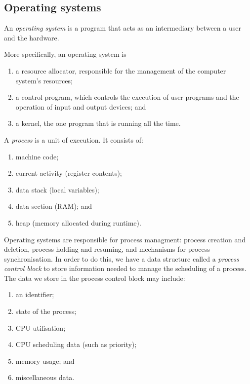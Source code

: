 \subsection{Operating systems}

\begin{definition}
	An \emph{operating system} is a program that acts as an intermediary
	between a user and the hardware.
\end{definition}

More specifically, an operating system is
\begin{enumerate}
	\item a resource allocator, responsible for the management of the 
	computer system's resources;
	\item a control program, which controls the execution of user programs
	and the operation of input and output devices; and
	\item a kernel, the one program that is running all the time.
\end{enumerate}

\begin{definition}[Process]
	A \emph{process} is a unit of execution.
	It consists of:
	\begin{enumerate}
		\item machine code;
		\item current activity (register contents);
		\item data stack (local variables);
		\item data section (RAM); and
		\item heap (memory allocated during runtime).	
	\end{enumerate}
\end{definition}

Operating systems are responsible for process managment:
process creation and deletion, process holding and resuming, and
mechanisms for process synchronisation.
In order to do this, we have a data structure called a
\emph{process control block} to store information needed to manage
the scheduling of a process. The data we store in the process control
block may include:
\begin{enumerate}
	\item an identifier;
	\item state of the process;
	\item CPU utilisation;
	\item CPU scheduling data (such as priority);
	\item memory usage; and
	\item miscellaneous data.
\end{enumerate}

